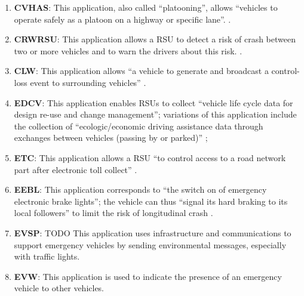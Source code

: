 \begin{enumerate}
\item \textbf{\acrfull{CVHAS}}: This application, also called ``platooning'', allows ``vehicles to operate safely as a platoon on a highway or specific lane''. \cite{etsi_etsi_tr_102_638_intelligent_2009,brown_review_2019}.
\item \textbf{\acrfull{CRWRSU}}: This application allows a \acrshort{RSU} to detect a risk of crash between two or more vehicles and to warn the drivers about this risk. \cite{etsi_etsi_tr_102_638_intelligent_2009,j_vehicle--vehicle_2014}.
\item \textbf{\acrfull{CLW}}: This application allows ``a vehicle to generate and broadcast a control-loss event to surrounding vehicles'' \cite{karagiannis_vehicular_2011}.
\item \textbf{\acrfull{EDCV}}: This application enables \acrshort{RSU}s to collect ``vehicle life cycle data for design re-use and change management''; variations of this application include the collection of ``ecologic/economic driving assistance data through exchanges between vehicles (passing by or parked)'' \cite{etsi_etsi_tr_102_638_intelligent_2009,papadimitratos_vehicular_2009,chang_estimated_2015};
\item \textbf{\acrfull{ETC}}: This application allows a \acrshort{RSU} ``to control access to a road network part after electronic toll collect'' \cite{etsi_etsi_tr_102_638_intelligent_2009,papadimitratos_vehicular_2009,brown_review_2019}.
\item \textbf{\acrfull{EEBL}}: This application corresponds to ``the switch on of emergency electronic brake lights''; the vehicle can thus ``signal its hard braking to its local followers'' to limit the risk of longitudinal crash \cite{etsi_etsi_tr_102_638_intelligent_2009,papadimitratos_vehicular_2009,brown_review_2019,j_vehicle--vehicle_2014,hamida_security_2015,boban_use_2017,etsi_tr_102_863_intelligent_2011,al-sultan_comprehensive_2014,miucic_v2x_2018,karagiannis_vehicular_2011,xu_dsrc_2017,zeadally_tutorial_2020,usdt_intelligent_2021}.
\item \textbf{\acrfull{EVSP}}: TODO This application uses infrastructure and communications to support emergency vehicles by sending environmental messages, especially with traffic lights. \cite{al-sultan_comprehensive_2014}
\item \textbf{\acrfull{EVW}}: This application is used to indicate the presence of an emergency vehicle to other vehicles. \cite{etsi_etsi_tr_102_638_intelligent_2009,raza_social_2018,al-sultan_comprehensive_2014,karagiannis_vehicular_2011,buchenscheit_vanet-based_2009}

\end{enumerate}
